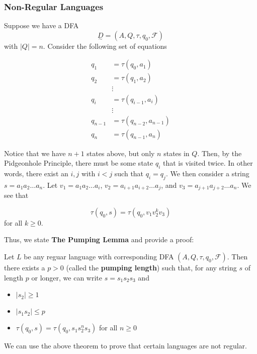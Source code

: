 \subsubsection{Non-Regular Languages}\label{subsubsec:non-regular-languages}
Suppose we have a DFA \[\underset{\sim}{D}=(A, Q, \tau, q_0, \mathcal{F})\] with \(|Q|=n\). Consider the following set of equations

\begin{align*}
      q_1 &= \tau(q_0, a_1)\\
      q_2 &= \tau(q_1, a_2)\\
          &\vdots \\
      q_i &= \tau(q_{i-1}, a_i)\\
          &\vdots \\
      q_{n-1} &= \tau(q_{n-2}, a_{n-1})\\
      q_n &= \tau(q_{n-1}, a_n)
\end{align*}

Notice that we have \(n+1\) states above, but only \(n\) states in \(Q\). Then, by the Pidgeonhole Principle, there must be some state \(q_i\) that is visited twice. In other words, there exist an \(i, j\) with \(i < j\) such that \(q_i=q_j\). We then consider a string \(s=a_1a_2\hdots a_n\). Let \(v_1=a_1a_2\hdots a_i\), \(v_2=a_{i+1}a_{i+2}\hdots a_j\), and \(v_3=a_{j+1}a_{j+2}\hdots a_n\). We see that 

\[\tau(q_0, s)=\tau(q_0, v_1v_2^k v_3)\] for all \(k\geq0\). 

\begin{center}
\end{center}

Thus, we state \textbf{The Pumping Lemma} and provide a proof:

\begin{theorem}
      Let \( L \) be any reguar language with corresponding DFA \((A, Q, \tau, q_0, \mathcal{F})\). Then there exists a \(p>0\) (called the \textbf{pumping length}) such that, for any string \(s\) of length \(p\) or longer, we can write \(s=s_1s_2s_3\) and
      \begin{itemize}
            \item \(|s_2|\geq 1\)
            \item \(|s_1s_2|\leq p\)
            \item \(\tau(q_0, s)=\tau(q_0, s_1s_2^n s_3)\) for all \(n\geq0\)
      \end{itemize}
\end{theorem}
We can use the above theorem to prove that certain languages are not regular. 

